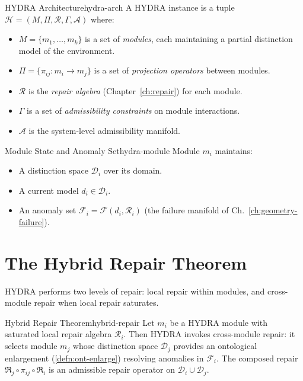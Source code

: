 \documentclass[12pt,twoside,openright]{book}
\newcommand{\adm}{\mathcal{A}}
\newcommand{\repair}{\mathfrak{R}}
\begin{document}
\begin{definition}{HYDRA Architecture}{hydra-arch}
  A HYDRA instance is a tuple
  $\mathcal{H} = (M, \Pi, \mathcal{R}, \Gamma, \adm)$
  where:
  \begin{itemize}[nosep]
    \item $M = \{m_1, \ldots, m_k\}$ is a set of
          \emph{modules}, each maintaining a partial
          distinction model of the environment.
    \item $\Pi = \{\pi_{ij} : m_i \to m_j\}$ is a set
          of \emph{projection operators} between modules.
    \item $\mathcal{R}$ is the \emph{repair algebra}
          (Chapter~\ref{ch:repair}) for each module.
    \item $\Gamma$ is a set of \emph{admissibility
          constraints} on module interactions.
    \item $\adm$ is the system-level admissibility
          manifold.
  \end{itemize}
\end{definition}

\begin{definition}{Module State and Anomaly Set}{hydra-module}
  Module $m_i$ maintains:
  \begin{itemize}[nosep]
    \item A distinction space $\mathcal{D}_i$ over its
          domain.
    \item A current model $d_i \in \mathcal{D}_i$.
    \item An anomaly set
          $\mathcal{F}_i = \mathcal{F}(d_i, \mathcal{R}_i)$
          (the failure manifold of Ch.~\ref{ch:geometry-failure}).
  \end{itemize}
\end{definition}

\section{The Hybrid Repair Theorem}

HYDRA performs two levels of repair: local repair within
modules, and cross-module repair when local repair
saturates.

\begin{theorem}{Hybrid Repair Theorem}{hybrid-repair}
  Let $m_i$ be a HYDRA module with saturated local repair
  algebra $\mathcal{R}_i$.
  Then HYDRA invokes cross-module repair:
  it selects module $m_j$ whose distinction space
  $\mathcal{D}_j$ provides an ontological enlargement
  (\cref{defn:ont-enlarge}) resolving anomalies in
  $\mathcal{F}_i$.
  The composed repair
  $\repair_j \circ \pi_{ij} \circ \repair_i$
  is an admissible repair operator on
  $\mathcal{D}_i \cup \mathcal{D}_j$.
\end{theorem}
\end{document}
